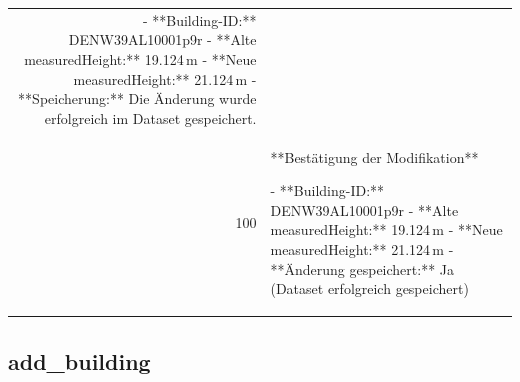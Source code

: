 \documentclass[a4paper,11pt]{article}
\begin{document}
\begin{table}[ht]
\begin{tabular}{r p{12cm}}
- **Building-ID:** DENW39AL10001p9r  
- **Alte measuredHeight:** 19.124 m  
- **Neue measuredHeight:** 21.124 m  
- **Speicherung:** Die Änderung wurde erfolgreich im Dataset gespeichert. \\
100 & **Bestätigung der Modifikation**

- **Building-ID:** DENW39AL10001p9r  
- **Alte measuredHeight:** 19.124 m  
- **Neue measuredHeight:** 21.124 m  
- **Änderung gespeichert:** Ja (Dataset erfolgreich gespeichert) \\
\hline
\end{tabular}
\end{table}

\clearpage
\subsection{add\_building}
\end{document}
